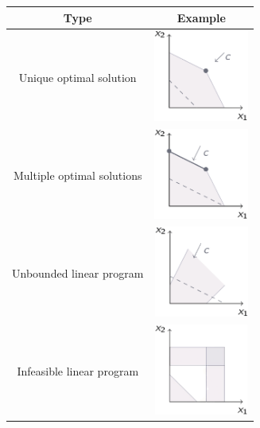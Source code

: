 \documentclass[12pt, a4paper]{report}
\begin{document}
    \begin{table}[H]
        \centering
        \begin{tabular}{cc}
        \hline
        \textbf{Type}              & \textbf{Example}                                                                                                   \\ \hline
        Unique optimal solution    & \begin{minipage}{.2\textwidth}\includegraphics[width=\linewidth, height=30mm]{images/un.png}\end{minipage}         \\ 
        Multiple optimal solutions & \begin{minipage}{.2\textwidth}\includegraphics[width=\linewidth, height=30mm]{images/mul.png}\end{minipage}        \\
        Unbounded linear program   & \begin{minipage}{.2\textwidth}\includegraphics[width=\linewidth, height=30mm]{images/unb.png}\end{minipage}        \\
        Infeasible linear program  & \begin{minipage}{.2\textwidth}\includegraphics[width=\linewidth, height=30mm]{images/in.png}\end{minipage}         \\     
        \hline       
        \end{tabular}
    \end{table}
    
\end{document}
